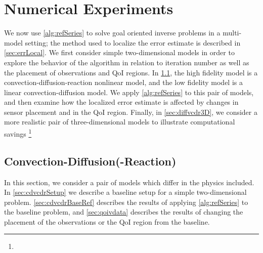 \section{Numerical Experiments}\label{sect:numexp}
%
We now use \cref{alg:refSeries} to solve goal oriented inverse problems in a multi-model setting; the method used to localize the error estimate is described in \cref{sec:errLocal}. We first consider simple two-dimensional models in order to explore the behavior of the algorithm in relation to iteration number as well as the placement of observations and QoI regions. In \cref{sec:cdvcdr}, the high fidelity model is a convection-diffusion-reaction nonlinear model, and the low fidelity model is a linear convection-diffusion model. We apply \cref{alg:refSeries} to this pair of models, and then examine how the localized error estimate is affected by changes in sensor placement and in the QoI region. Finally, in \cref{sec:diffvcdr3D}, we consider a more realistic pair of three-dimensional models to illustrate computational savings \footnote{}


\subsection{Convection-Diffusion(-Reaction)} \label{sec:cdvcdr}
In this section, we consider a pair of models which differ in the physics included. In \cref{sec:cdvcdrSetup} we describe a baseline setup for a simple two-dimensional problem. \cref{sec:cdvcdrBaseRef} describes the results of applying \cref{alg:refSeries} to the baseline problem, and \cref{sec:qoivdata} describes the results of changing the placement of the observations or the QoI region from the baseline.
%
